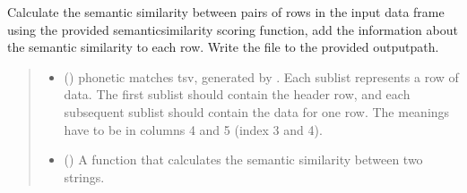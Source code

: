 \documentclass[letterpaper,10pt,english]{sphinxmanual}
\begin{document}

\begin{fulllineitems}
\label{\detokenize{documentation:loanpy.loanfinder.semantic_matches}}
\pysigstartsignatures
{}
\pysigstopsignatures
\sphinxAtStartPar
Calculate the semantic similarity between pairs of rows in the input
data frame using the provided semantic\sphinxhyphen{}similarity scoring function, add
the information about the semantic similarity to each row. Write the file
to the provided output\sphinxhyphen{}path.
\begin{quote}\begin{description}
\begin{itemize}
\item {} 
\sphinxAtStartPar
{} () \textendash{} phonetic matches tsv, generated by
. Each sublist represents a
row of data. The first sublist should contain the header
row, and each subsequent sublist should contain the data
for one row. The meanings have to be in columns 4 and 5
(index 3 and 4).

\item {} 
\sphinxAtStartPar
{} () \textendash{} A function that calculates the semantic similarity
between two strings.


\end{itemize}
\end{description}
\end{quote}
\end{fulllineitems}
\end{document}
